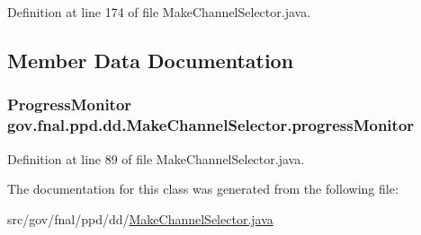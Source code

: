 Definition at line 174 of file Make\-Channel\-Selector.\-java.



\subsection{Member Data Documentation}
\hypertarget{classgov_1_1fnal_1_1ppd_1_1dd_1_1MakeChannelSelector_a2e1e2b8a0cc313913c6bd4a27307ac3b}{
\subsubsection[{progress\-Monitor}]{\setlength{\rightskip}{0pt plus 5cm}Progress\-Monitor gov.\-fnal.\-ppd.\-dd.\-Make\-Channel\-Selector.\-progress\-Monitor\hspace{0.3cm}{\ttfamily [static]}}}\label{classgov_1_1fnal_1_1ppd_1_1dd_1_1MakeChannelSelector_a2e1e2b8a0cc313913c6bd4a27307ac3b}


Definition at line 89 of file Make\-Channel\-Selector.\-java.



The documentation for this class was generated from the following file\-:\begin{DoxyCompactItemize}
\item 
src/gov/fnal/ppd/dd/\hyperlink{MakeChannelSelector_8java}{Make\-Channel\-Selector.\-java}\end{DoxyCompactItemize}
